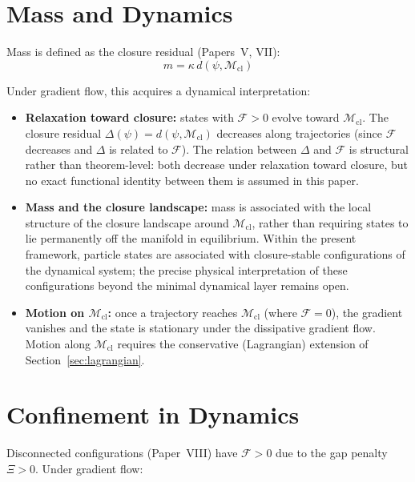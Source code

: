 \documentclass[12pt]{article}
\newcommand{\Mcl}{\mathcal{M}_{\mathrm{cl}}}
\newcommand{\Fcal}{\mathcal{F}}
\begin{document}
\section{Mass and Dynamics}\label{sec:mass}

Mass is defined as the closure residual (Papers~V, VII):
\begin{equation}
    m = \kappa\, d(\psi, \Mcl)
\end{equation}

Under gradient flow, this acquires a dynamical interpretation:

\begin{itemize}
    \item \textbf{Relaxation toward closure:} states with $\Fcal > 0$ evolve toward $\Mcl$. The closure residual $\Delta(\psi) = d(\psi, \Mcl)$ decreases along trajectories (since $\Fcal$ decreases and $\Delta$ is related to $\Fcal$). The relation between $\Delta$ and $\Fcal$ is structural rather than theorem-level: both decrease under relaxation toward closure, but no exact functional identity between them is assumed in this paper.
    \item \textbf{Mass and the closure landscape:} mass is associated with the local structure of the closure landscape around $\Mcl$, rather than requiring states to lie permanently off the manifold in equilibrium. Within the present framework, particle states are associated with closure-stable configurations of the dynamical system; the precise physical interpretation of these configurations beyond the minimal dynamical layer remains open.
    \item \textbf{Motion on $\Mcl$:} once a trajectory reaches $\Mcl$ (where $\Fcal = 0$), the gradient vanishes and the state is stationary under the dissipative gradient flow. Motion along $\Mcl$ requires the conservative (Lagrangian) extension of Section~\ref{sec:lagrangian}.
\end{itemize}

\section{Confinement in Dynamics}\label{sec:confinement}

Disconnected configurations (Paper~VIII) have $\Fcal > 0$ due to the gap penalty $\Xi > 0$. Under gradient flow:
\end{document}
